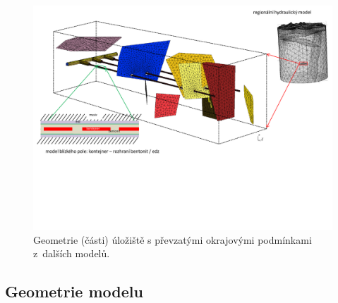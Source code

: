 \documentclass[11pt,a4paper]{article}
\begin{document}
\begin{onehalfspacing}
\begin{figure}[H]
\centering
\includegraphics[width=16cm]{graphics/obr_ralek/schema_modelu01.pdf}
\vspace{-4.5cm}
\caption{Geometrie (části) úložiště s převzatými okrajovými podmínkami z~dalších modelů.}
\label{schema_modelu}
\end{figure}

\newpage

\subsection{Geometrie modelu}


\end{onehalfspacing}
\end{document}

